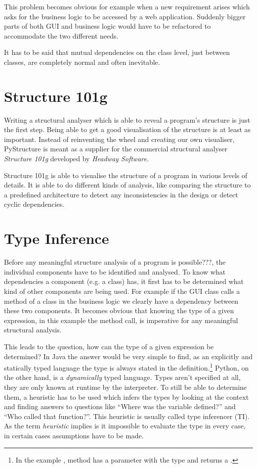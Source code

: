 \documentclass[12pt,halfparskip,DIV11,BCOR10mm]{scrreprt}
\begin{document}
This problem becomes obvious for example when a new requirement arises which asks for the business logic to be accessed by a web application. Suddenly bigger parts of both GUI and business logic would have to be refactored to accommodate the two different needs.

It has to be said that mutual dependencies on the class level, just between classes, are completely normal and often inevitable.

\section{Structure 101g}

Writing a structural analyser which is able to reveal a program's structure is just the first step. Being able to get a good visualisation of the structure is at least as important. Instead of reinventing the wheel and creating our own visualiser, PyStructure is meant as a supplier for the commercial structural analyser \emph{Structure 101g} developed by \emph{Headway Software}.

Structure 101g is able to visualise the structure of a program in various levels of details. It is able to do different kinds of analysis, like comparing the structure to a predefined architecture to detect any inconsistencies in the design or detect cyclic dependencies.

\section{Type Inference}

Before any meaningful structure analysis of a program is possible???, the individual components have to be identified and analysed. To know what dependencies a component (e.g. a class) has, it first has to be determined what kind of other components are being used. For example if the GUI class calls a method of a class in the business logic we clearly have a dependency between these two components. It becomes obvious that knowing the type of a given expression, in this example the method call, is imperative for any meaningful structural analysis.

This leads to the question, how can the type of a given expression be determined? In Java the answer would be very simple to find, as an explicitly and statically typed language the type is always stated in the definition.\footnote{In the example , method  has a parameter  with the type  and returns a .} Python, on the other hand, is a \emph{dynamically} typed language. Types aren't specified at all, they are only known at runtime by the interpreter. To still be able to determine them, a heuristic has to be used which infers the types by looking at the context and finding answers to questions like ``Where was the variable defined?'' and ``Who called that function?''. This heuristic is usually called type inferencer (TI). As the term \emph{heuristic} implies is it impossible to evaluate the type in every case, in certain cases assumptions have to be made.
\end{document}
